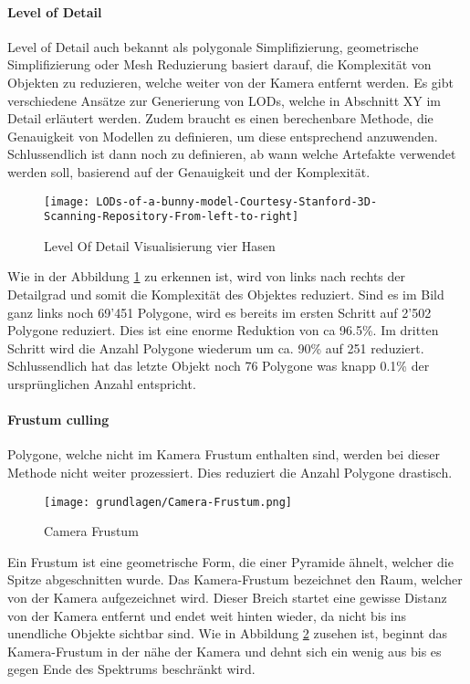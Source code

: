 \paragraph{Level of Detail}
Level of Detail auch bekannt als polygonale Simplifizierung, geometrische Simplifizierung oder Mesh Reduzierung basiert darauf, die Komplexität von Objekten zu reduzieren, welche weiter von der Kamera entfernt werden. Es gibt verschiedene Ansätze zur Generierung von LODs, welche in Abschnitt XY im Detail erläutert werden. Zudem braucht es einen berechenbare Methode, die Genauigkeit von Modellen zu definieren, um diese entsprechend anzuwenden. Schlussendlich ist dann noch zu definieren, ab wann welche Artefakte verwendet werden soll, basierend auf der Genauigkeit und der Komplexität.

\begin{figure}[H]
\centering
\texttt{[image: LODs-of-a-bunny-model-Courtesy-Stanford-3D-Scanning-Repository-From-left-to-right]}
\caption{Level Of Detail Visualisierung vier Hasen}
\label{fig:LevelOfDetailVisualisierungvierHasen}
\end{figure}

Wie in der Abbildung \ref{fig:LevelOfDetailVisualisierungvierHasen} zu erkennen ist, wird von links nach rechts der Detailgrad und somit die Komplexität des Objektes reduziert. Sind es im Bild ganz links noch 69'451 Polygone, wird es bereits im ersten Schritt auf 2'502 Polygone reduziert. Dies ist eine enorme Reduktion von ca 96.5\%. Im dritten Schritt wird die Anzahl Polygone wiederum um ca. 90\% auf 251 reduziert. Schlussendlich hat das letzte Objekt noch 76 Polygone was knapp 0.1\% der ursprünglichen Anzahl entspricht.

\paragraph{Frustum culling}
Polygone, welche nicht im Kamera Frustum enthalten sind, werden bei dieser Methode nicht weiter prozessiert.
Dies reduziert die Anzahl Polygone drastisch.

\begin{figure}[H]
  \centering
  \texttt{[image: grundlagen/Camera-Frustum.png]}
  \caption{Camera Frustum}
  \label{fig:CameraFrustum}
\end{figure}

Ein Frustum ist eine geometrische Form, die einer Pyramide ähnelt, welcher die Spitze abgeschnitten wurde.
Das Kamera-Frustum bezeichnet den Raum, welcher von der Kamera aufgezeichnet wird. Dieser Breich startet eine gewisse Distanz von der Kamera entfernt und endet weit hinten wieder, da nicht bis ins unendliche Objekte sichtbar sind.
Wie in Abbildung \ref{fig:CameraFrustum} zusehen ist, beginnt das Kamera-Frustum in der nähe der Kamera und dehnt sich ein wenig aus bis es gegen Ende des Spektrums beschränkt wird.

